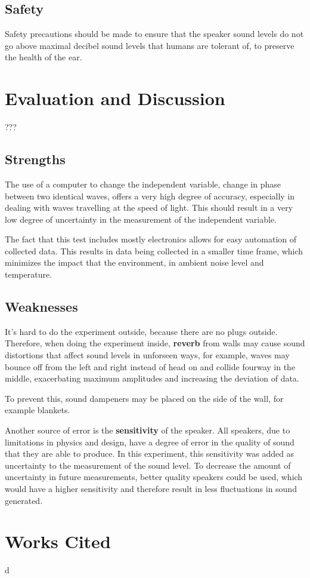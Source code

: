 \documentclass[12pt]{article}
\begin{document}
\subsection{Safety}

Safety precautions should be made to ensure that the speaker sound levels do not go above maximal decibel sound levels that humans are tolerant of, to preserve the health of the ear.

\section{Evaluation and Discussion}???

\subsection{Strengths}

The use of a computer to change the independent variable, change in phase between two identical waves, offers a very high degree of accuracy, especially in dealing with waves travelling at the speed of light. This should result in a very low degree of uncertainty in the measurement of the independent variable.

The fact that this test includes mostly electronics allows for easy automation of collected data. This results in data being collected in a smaller time frame, which minimizes the impact that the environment, in ambient noise level and temperature.

\subsection{Weaknesses}

It's hard to do the experiment outside, because there are no plugs outside. Therefore, when doing the experiment inside, \textbf{reverb} from walls may cause sound distortions that affect sound levels in unforseen ways, for example, waves may bounce off from the left and right instead of head on and collide fourway in the middle, exacerbating maximum amplitudes and increasing the deviation of data.

To prevent this, sound dampeners may be placed on the side of the wall, for example blankets.

Another source of error is the \textbf{sensitivity} of the speaker. All speakers, due to limitations in physics and design, have a degree of error in the quality of sound that they are able to produce. In this experiment, this sensitivity was added as uncertainty to the measurement of the sound level. To decrease the amount of uncertainty in future measurements, better quality speakers could be used, which would have a higher sensitivity and therefore result in less fluctuations in sound generated.

\section{Works Cited}

\printbibliography
d
\end{document}
